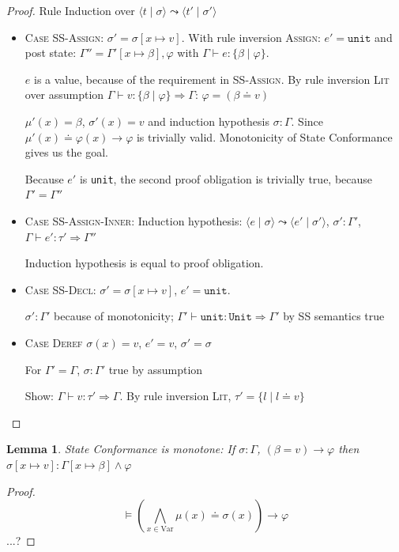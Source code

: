 \documentclass{book}
\newcommand{\code}[1]{\texttt{#1}}
\newcommand{\tuple}[2]{\langle #1 \mid #2 \rangle}
\newtheorem{lemma}[theorem]{Lemma}
\theoremstyle{definition}
\begin{document}
\begin{proof} Rule Induction over $\tuple{t}{\sigma} \leadsto \tuple{t'}{\sigma'}$
\begin{itemize}
  \item \textsc{Case SS-Assign}:
    $\sigma' = \sigma[x \mapsto v]$. With rule inversion \textsc{Assign}: $e' = \code{unit}$ and post state: $\Gamma'' = \Gamma'[x \mapsto \beta], \varphi$ with $\Gamma \vdash e : \{ \beta \mid \varphi \}$.

    $e$ is a value, because of the requirement in \textsc{SS-Assign}. By rule inversion \textsc{Lit} over assumption $\Gamma \vdash v: \{ \beta \mid \varphi \} \Rightarrow \Gamma$: $\varphi = (\beta \doteq v)$

    $\mu'(x) = \beta$, $\sigma'(x) = v$ and induction hypothesis $\sigma : \Gamma$. Since $\mu'(x) \doteq \varphi(x) \to \varphi$ is trivially valid. Monotonicity of State Conformance gives us the goal.

    Because $e'$ is \code{unit}, the second proof obligation is trivially true, because $\Gamma' = \Gamma''$
  \item \textsc{Case SS-Assign-Inner}:
    Induction hypothesis: $\tuple{e}{\sigma} \leadsto \tuple{e'}{\sigma'}$, $\sigma' : \Gamma'$, $\Gamma \vdash e' : \tau' \Rightarrow \Gamma''$
    
    Induction hypothesis is equal to proof obligation.
  \item \textsc{Case SS-Decl}:
    $\sigma' = \sigma[ x \mapsto v]$, $e' = \code{unit}$.
    
    $\sigma' : \Gamma'$ because of monotonicity; $\Gamma' \vdash \code{unit} : \code{Unit} \Rightarrow \Gamma'$ by SS semantics true
  \item \textsc{Case Deref}
    $\sigma(x) = v$, $e' = v$, $\sigma' = \sigma$

    For $\Gamma' = \Gamma$, $\sigma : \Gamma'$ true by assumption

    Show: $\Gamma \vdash v : \tau' \Rightarrow \Gamma$. By rule inversion \textsc{Lit}, $\tau' = \{ l \mid l \doteq v \}$
\end{itemize}
\end{proof}

\begin{lemma}
  State Conformance is monotone: If $\sigma : \Gamma$, $(\beta = v) \to \varphi$ then
    $\sigma[x \mapsto v] : \Gamma[x \mapsto \beta] \wedge \varphi$
\end{lemma}

\begin{proof}
  $$\vDash \left(\bigwedge_{x \in \text{Var}} \mu(x) \doteq \sigma(x)\right) \to \varphi$$
  ...?
\end{proof}
\end{document}
